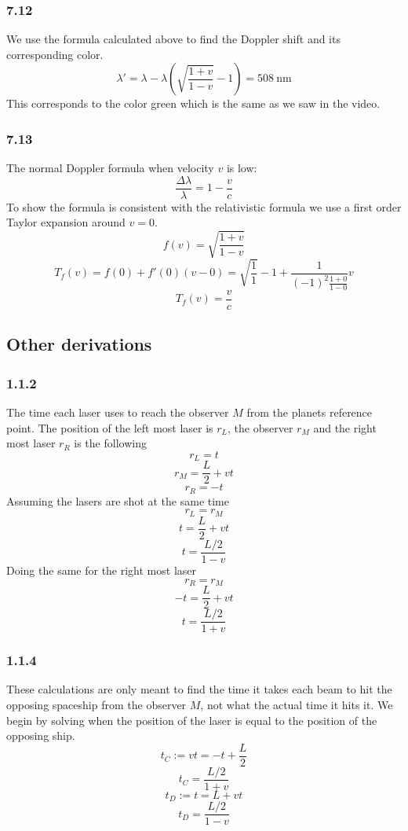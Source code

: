 \documentclass[reprint,english,notitlepage]{revtex4-2}
\begin{document}
\subsubsection*{7.12}
We use the formula calculated above to find the Doppler shift and its corresponding color.
\[
λ' = λ -  λ \left( \sqrt{\frac{1 + v}{1 - v}} -1 \right) = 508 \ \text{nm}
\]
This corresponds to the color green which is the same as we saw in the video. 

\subsubsection*{7.13}
The normal Doppler formula when velocity $ v $ is low:
\[
\frac{Δλ}{λ} = 1 - \frac{v}{c}
\]
To show the formula is consistent with the relativistic formula we use a first order Taylor expansion around $ v = 0 $.
\[
f(v) = \sqrt{\frac{1 + v}{1 - v}} 
\] 
\[
T_{f}(v) = f(0) + f'(0)(v-0) = \sqrt{\frac{1}{1}} - 1 + \frac{1}{\left(  - 1 \right) ^{2} \frac{1 + 0}{1-0}}  v
\]
\[
T_{f}(v) = \frac{v}{c}
\]
  



\subsection{Other derivations}
\subsubsection*{1.1.2}\label{o: 1.1.2}
The time each laser uses to reach the observer $ M $ from the planets reference point. The position of the left most laser is $ r_L $, the observer $ r_M $  and the right most laser $ r_R $ is the following
\[
r_L = t
\]
\[
r_M = \frac{L}{2} + vt
\]
\[
r_R = -t
\]
Assuming the lasers are shot at the same time
\[
r_L = r_M
\]
\[
t = \frac{L}{2} + vt
\]
\[
t = \frac{L / 2}{1 - v}
\]
Doing the same for the right most laser
\[
r_R = r_M
\]
\[
-t = \frac{L}{2} + vt
\]
\[
t = \frac{L / 2}{1 + v}
\]
\subsubsection*{1.1.4}\label{o: 1.1.4}
These calculations are only meant to find the time it takes each beam to hit the opposing spaceship from the observer $ M $, not what the actual time it hits it.
We begin by solving when the position of the laser is equal to the position of the opposing ship. 
\[
t_C:= vt = -t + \frac{L}{2}
\]
\[
t_C = \frac{L/ 2}{1 + v}
\]
\[
t_D:= t = L + vt
\]
\[
t_D = \frac{L / 2}{1 - v}
\]
\end{document}
